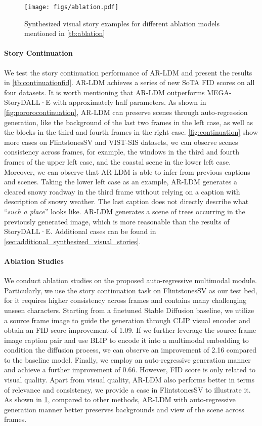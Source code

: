 \documentclass[10pt,twocolumn,letterpaper]{article}
\begin{document}
\begin{figure}[!t]
    \centering
    \texttt{[image: figs/ablation.pdf]}
    \caption{Synthesized visual story examples for different ablation models mentioned in \cref{tb:ablation}}
    \label{fig:ablation}
\end{figure}

\paragraph{Story Continuation}
We test the story continuation performance of AR-LDM and present the results in \cref{tb:continuationfid}. AR-LDM achieves a series of new SoTA FID scores on all four datasets.
It is worth mentioning that AR-LDM outperforms MEGA-StoryDALL·E with approximately half parameters. As shown in \cref{fig:pororocontinuation}, AR-LDM can preserve scenes through auto-regression generation, like the background of the last two frames in the left case, as well as the blocks in the third and fourth frames in the right case. \cref{fig:continuation} show more cases on FlintstonesSV and VIST-SIS datasets, we can observe scenes consistency across frames, for example, the windows in the third and fourth frames of the upper left case, and the coastal scene in the lower left case. Moreover, we can observe that AR-LDM is able to infer from previous captions and scenes. Taking the lower left case as an example, AR-LDM generates a cleared snowy roadway in the third frame without relying on a caption with description of snowy weather. The last caption does not directly describe what ``\textit{such a place}'' looks like. 
AR-LDM generates a scene of trees occurring in the previously generated image, which is more reasonable than the results of StoryDALL·E. Additional cases can be found in \cref{sec:additional_synthesized_visual_stories}.

\paragraph{Ablation Studies}
We conduct ablation studies on the proposed auto-regressive multimodal module. Particularly, we use the story continuation task on FlintstonesSV as our test bed, for it requires higher consistency across frames and contains many challenging unseen characters. Starting from a finetuned Stable Diffusion baseline, we utilize a source frame image to guide the generation through CLIP visual encoder and obtain an FID score improvement of 1.09. If we further leverage the source frame image caption pair and use BLIP to encode it into a multimodal embedding to condition the diffusion process, we can observe an improvement of 2.16 compared to the baseline model. Finally, we employ an auto-regressive generation manner and achieve a further improvement of 0.66. However, FID score is only related to visual quality. Apart from visual quality, AR-LDM also performs better in terms of relevance and consistency, we provide a case in FlintstonesSV to illustrate it. As shown in \cref{fig:ablation}, compared to other methods, AR-LDM with auto-regressive generation manner better preserves backgrounds and view of the scene across frames.
\end{document}
